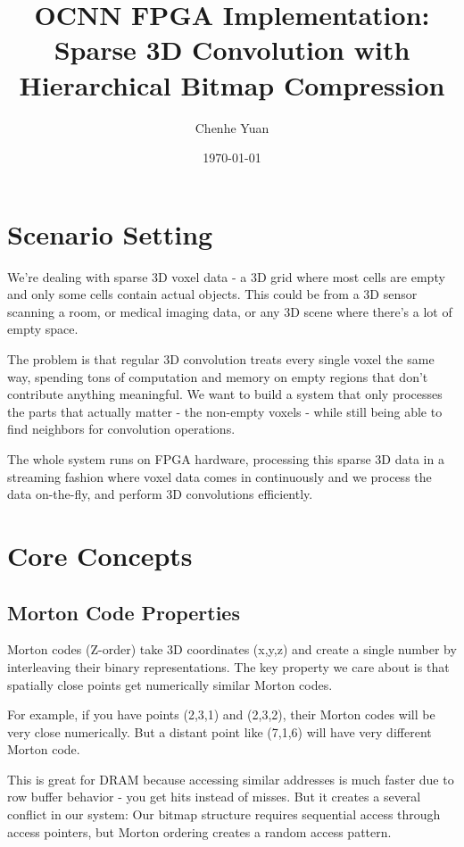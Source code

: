 \documentclass[12pt]{article}
\title{OCNN FPGA Implementation: Sparse 3D Convolution with Hierarchical Bitmap Compression}
\author{Chenhe Yuan}
\date{\today}
\begin{document}
\maketitle

\tableofcontents
\newpage

\section{Scenario Setting}

We're dealing with sparse 3D voxel data - a 3D grid where most cells are empty and only some cells contain actual objects. This could be from a 3D sensor scanning a room, or medical imaging data, or any 3D scene where there's a lot of empty space.

The problem is that regular 3D convolution treats every single voxel the same way, spending tons of computation and memory on empty regions that don't contribute anything meaningful. We want to build a system that only processes the parts that actually matter - the non-empty voxels - while still being able to find neighbors for convolution operations.

The whole system runs on FPGA hardware, processing this sparse 3D data in a streaming fashion where voxel data comes in continuously and we process the data on-the-fly, and perform 3D convolutions efficiently.

\section{Core Concepts}

\subsection{Morton Code Properties}
Morton codes (Z-order) take 3D coordinates (x,y,z) and create a single number by interleaving their binary representations. The key property we care about is that spatially close points get numerically similar Morton codes.

For example, if you have points (2,3,1) and (2,3,2), their Morton codes will be very close numerically. But a distant point like (7,1,6) will have very different Morton code.

This is great for DRAM because accessing similar addresses is much faster due to row buffer behavior - you get hits instead of misses. But it creates a several conflict in our system: Our bitmap structure requires sequential access through access pointers, but Morton ordering creates a random access pattern.
\end{document}
